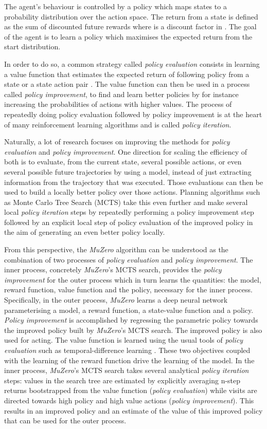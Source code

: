 \documentclass{article}
\newcommand{\muzero}{\emph{MuZero}}
\begin{document}
The agent's behaviour is controlled by a policy  which maps states to a probability distribution over the action space. The return from a state is defined as the sum of discounted future rewards  where  is a discount factor in . The goal of the agent is to learn a policy which maximises the expected return from the start distribution.

In order to do so, a common strategy called \emph{policy evaluation} consists in learning a value function that estimates the expected return of following policy  from a state  or a state action pair . The value function can then be used in a process called \emph{policy improvement}, to find and learn better policies by for instance increasing the probabilities of actions with higher values. The process of repeatedly doing policy evaluation followed by policy improvement is at the heart of many reinforcement learning algorithms and is called \emph{policy iteration}.

Naturally, a lot of research focuses on improving the methods for \emph{policy evaluation} and \emph{policy improvement}. One direction for scaling the efficiency of both is to evaluate, from the current state, several possible actions, or even several possible future trajectories by using a model, instead of just extracting information from the trajectory that was executed. Those evaluations can then be used to build a locally better policy over those actions. Planning algorithms such as Monte Carlo Tree Search (MCTS) \cite{coulom:mcts} take this even further and make several local \emph{policy iteration} steps by repeatedly performing a policy improvement step followed by an explicit local step of policy evaluation of the improved policy in the aim of generating an even better policy locally.

From this perspective, the \muzero{} algorithm can be understood as the combination of two processes of \emph{policy evaluation} and \emph{policy improvement}. The inner process, concretely \muzero{}'s MCTS search, provides the \emph{policy improvement} for the outer process which in turn learns the quantities: the model, reward function, value function and the policy, necessary for the inner process. Specifically, in the outer process, \muzero{} learns a deep neural network parameterising a model, a reward function, a state-value function and a policy. \emph{Policy improvement} is accomplished by regressing the parametric policy towards the improved policy built by \muzero{}'s MCTS search. The improved policy is also used for acting. The value function is learned using the usual tools of \emph{policy evaluation} such as temporal-difference learning \cite{sutton88}. These two objectives coupled with the learning of the reward function drive the learning of the model. In the inner process, \muzero{}'s MCTS search takes several analytical \emph{policy iteration} steps: values in the search tree are estimated by explicitly averaging n-step returns bootstrapped from the value function (\emph{policy evaluation}) while visits are directed towards high policy and high value actions (\emph{policy improvement}). This results in an improved policy and an estimate of the value of this improved policy that can be used for the outer process.
\end{document}
